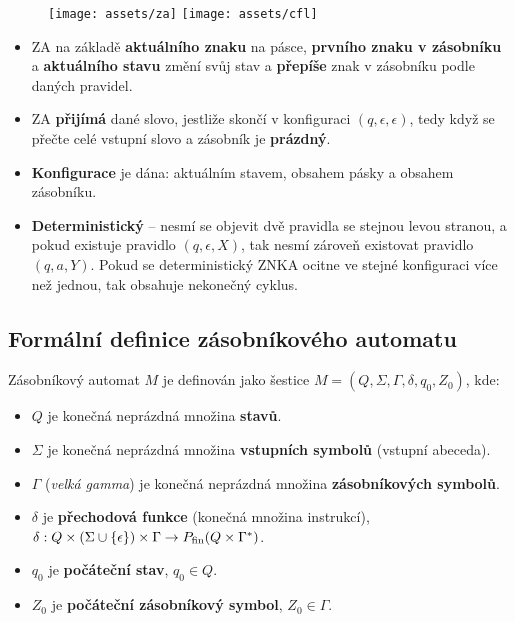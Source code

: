 \begin{figure}[H]
    \centering
    \texttt{[image: assets/za]}
    \texttt{[image: assets/cfl]}
\end{figure}

\begin{itemize}
    \item ZA na základě \textbf{aktuálního znaku} na pásce, \textbf{prvního znaku v zásobníku} a \textbf{aktuálního stavu} změní svůj stav a \textbf{přepíše} znak v zásobníku podle daných pravidel.
    \item ZA \textbf{přijímá} dané slovo, jestliže skončí v konfiguraci $(q, \epsilon, \epsilon)$, tedy když se přečte celé vstupní slovo a zásobník je \textbf{prázdný}.
    \item \textbf{Konfigurace} je dána: aktuálním stavem, obsahem pásky a obsahem zásobníku.
    \item \textbf{Deterministický} -- nesmí se objevit dvě pravidla se stejnou levou stranou, a pokud existuje
          pravidlo $(q, \epsilon, X)$, tak nesmí zároveň existovat pravidlo $(q, a, Y)$. Pokud se deterministický ZNKA ocitne
          ve stejné konfiguraci více než jednou, tak obsahuje nekonečný cyklus.
\end{itemize}

\subsection{Formální definice zásobníkového automatu}
Zásobníkový automat $M$ je definován jako šestice $M = (Q, \Sigma, \Gamma, \delta, q_0, Z_0)$, kde:
\begin{itemize}
    \item $Q$ je konečná neprázdná množina \textbf{stavů}.
    \item $\Sigma$ je konečná neprázdná množina \textbf{vstupních symbolů} (vstupní abeceda).
    \item $\Gamma$ (\textit{velká gamma}) je konečná neprázdná množina \textbf{zásobníkových symbolů}.
    \item $\delta$ je \textbf{přechodová funkce} (konečná množina instrukcí), $\delta: Q \times (\Sigma \cup \{\epsilon\}) \times \Gamma \rightarrow P_{\rm fin}(Q \times \Gamma^*)$.
    \item $q_0$ je \textbf{počáteční stav}, $q_0 \in Q$.
    \item $Z_0$ je \textbf{počáteční zásobníkový symbol}, $Z_0 \in \Gamma$.
\end{itemize}

